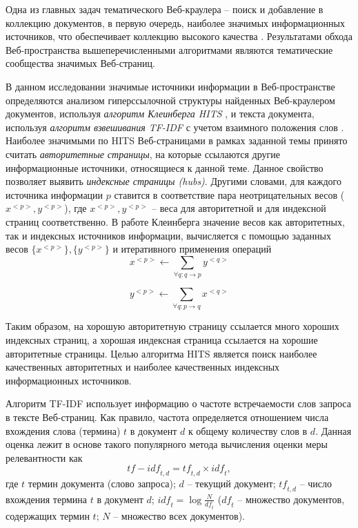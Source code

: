 Одна из главных задач тематического Веб-краулера -- поиск и добавление в коллекцию документов, в первую очередь, наиболее значимых информационных источников, что обеспечивает коллекцию высокого качества \cite{ArasuChoGM}. Результатами обхода Веб-пространства вышеперечисленными алгоритмами являются тематические сообщества \cite{GibsonKleinbergRaghavan} значимых Веб-страниц.

В данном исследовании значимые источники информации в Веб-пространстве определяются анализом гиперссылочной структуры найденных Веб-краулером документов, используя \textit{алгоритм Клеинберга HITS} \cite{Kleinberg}, и текста документа, используя \textit{алгоритм взвешивания TF-IDF} \cite{SinghalKaszkiel} с учетом взаимного положения слов \cite{Gubin}. Наиболее значимыми по HITS Веб-страницами в рамках заданной темы принято считать \textit{авторитетные страницы}, на которые ссылаются другие информационные источники, относящиеся к данной теме. Данное свойство позволяет выявить \textit{индексные страницы (hubs)}. Другими словами, для каждого источника информации \(p\) ставится в соответствие пара неотрицательных весов (\(x^{<p>}, y^{<p>}\)), где \(x^{<p>}, y^{<p>}\) -- веса для авторитетной и для индексной страниц соответственно. В работе Клеинберга \cite{Kleinberg} значение весов как авторитетных, так и индексных источников информации, вычисляется с помощью заданных весов \(\{x^{<p>}\}, \{y^{<p>}\}\) и итеративного применения операций
\begin{equation}
	\label{eqn:1}
	x^{<p>} \leftarrow \sum_{\forall q: q \rightarrow p} y^{<q>}
\end{equation}

\begin{equation}
	\label{eqn:2}
	y^{<p>} \leftarrow \sum_{\forall q: p \rightarrow q} x^{<q>}
\end{equation}

Таким образом, на хорошую авторитетную страницу ссылается много хороших индексных страниц, а хорошая индексная страница ссылается на хорошие авторитетные страницы. Целью алгоритма HITS является поиск наиболее качественных авторитетных и наиболее качественных индексных информационных источников.

Алгоритм TF-IDF использует информацию о частоте встречаемости слов запроса в тексте Веб-страниц. Как правило, частота определяется отношением числа вхождения слова (термина) \(t\) в документ \(d\) к общему количеству слов в \(d\). Данная оценка лежит в основе такого популярного метода вычисления оценки меры релевантности как
\begin{equation}
	\label{eqn:3}
	\textit{tf} - \textit{idf}_{t, d} = \textit{tf}_{t, d} \times \textit{idf}_t ,
\end{equation} 
где \(t\) термин документа (слово запроса); \(d\) -- текущий документ; \(\textit{tf}_{t, d}\) -- число вхождения термина \(t\) в документ \(d\); \( \textit{idf}_t = \log{\frac{N}{ \textit{df}_t}}\) (\( \textit{df}_t\) – множество документов, содержащих термин \(t\); \(N\) -- множество всех документов).

